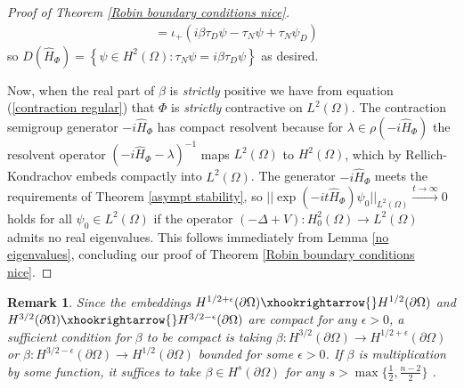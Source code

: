\documentclass{article}
\numberwithin{equation}{section}
\newtheorem{remark}{Remark}[section]
\begin{document}
\begin{proof}[Proof of Theorem \ref{Robin boundary conditions nice}]
\begin{equation}
\begin{split}
        &=\iota_+(i \beta  \tau_D \psi-\tau_N \psi + \tau_N \psi_D ) 
    \end{split}
    \end{equation}
    so $D(\hat{H}_\Phi)=  \left\{\psi \in H^2(\Omega):\tau_N \psi=i \beta \tau_D \psi \right\} $ as desired. 
    \par
    Now, when the real part of $\beta$ is \textit{strictly} positive we have from equation (\ref{contraction regular}) that $\Phi$ is \textit{strictly} contractive on $L^2(\Omega)$. The contraction semigroup generator $-i\hat{H}_\Phi$ has compact resolvent because for $\lambda \in \rho(-i\hat{H}_\Phi)$ the resolvent operator $(-i\hat{H}_\Phi - \lambda)^{-1}$ maps $L^2(\Omega)$ to $H^2(\Omega)$, which by Rellich-Kondrachov \cite{Brezis} embeds compactly into $L^2(\Omega)$. The generator $-i\hat{H}_\Phi$ meets the requirements of Theorem \ref{asympt stability}, so $||\exp(-it\hat{H}_\Phi)\psi_0||_{L^2(\Omega)}\xrightarrow{t\to \infty}0$ holds for all $\psi_0 \in L^2(\Omega)$ if the operator $(-\Delta+V):H^2_0(\Omega)\to L^2(\Omega)$ admits no real eigenvalues. This follows immediately from Lemma \ref{no eigenvalues}, concluding our proof of Theorem \ref{Robin boundary conditions nice}.
 \end{proof}
 \begin{remark}
        Since the embeddings $H^{1/2 +\epsilon}(\partial \Omega) \xhookrightarrow{} H^{1/2}(\partial \Omega)$ and $H^{3/2}(\partial \Omega) \xhookrightarrow{} H^{3/2-\epsilon}(\partial \Omega)$ are compact \cite{Brezis} for any $\epsilon>0$, a sufficient condition for $\beta$ to be compact is taking $\beta:H^{3/2}(\partial \Omega)\to H^{1/2+\epsilon}(\partial \Omega)$ or $\beta:H^{3/2 -\epsilon}(\partial \Omega)\to H^{1/2}(\partial \Omega)$ bounded for some $\epsilon>0$. If $\beta$ is multiplication by some function, it suffices to take $\beta \in H^s(\partial \Omega)$ for any $s>\max \{\frac{1}{2},\frac{n-2}{2}\}$ \cite{behzadan2021multiplicationsobolevspacesrevisited}.
    \end{remark}
\end{document}
